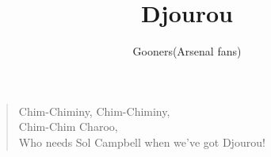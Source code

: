\documentclass[a4paper,12pt]{article}
\title{Djourou}
\author{Gooners(Arsenal fans)}
\date{}
\begin{document}
	
	\maketitle
	
	\begin{verse}
		
		Chim-Chiminy, Chim-Chiminy, \\
		Chim-Chim Charoo, \\
		Who needs Sol Campbell when we've got Djourou!
		
	\end{verse}
	
\end{document}
